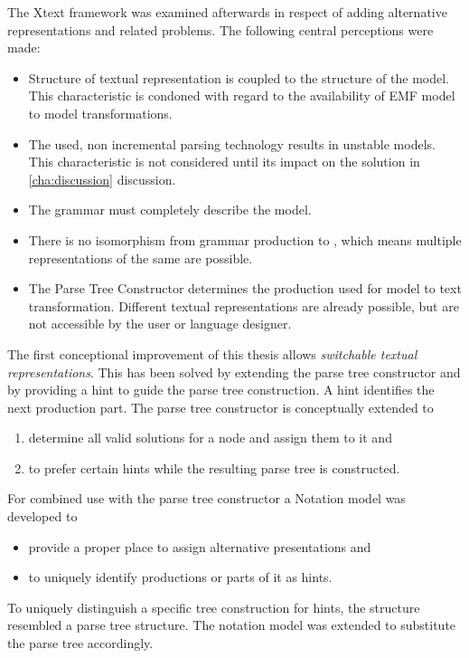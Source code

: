 The Xtext framework was examined afterwards in respect of adding alternative representations and related problems. The following central perceptions were made:
\begin{itemize}
	\item Structure of textual representation is coupled to the structure of the model. This characteristic is condoned with regard to the availability of EMF model to model transformations.
	\item The used, non incremental parsing technology results in unstable models. This characteristic is not considered until its impact on the solution in \ref{cha:discussion} discussion.
	\item The grammar must completely describe the model. 
	\item There is no isomorphism from grammar production to , which means multiple representations of the same  are possible.
	\item The Parse Tree Constructor determines the production used for model to text transformation. Different textual representations are already possible, but are not accessible by the user or language designer. \\
\end{itemize}
 
 
The first conceptional improvement of this thesis allows \emph{switchable textual representations}. This has been solved by extending the parse tree constructor and by providing a hint to guide the parse tree construction. A hint identifies the next production part.
The parse tree constructor is conceptually extended to
\begin{enumerate}
	\item determine all valid solutions for a node and assign them to it and
	\item to prefer certain hints while the resulting parse tree is constructed.
\end{enumerate}
For combined use with the parse tree constructor a Notation model was developed to
\begin{itemize}
	\item provide a proper place to assign alternative presentations and
	\item to uniquely identify productions or parts of it as hints.
\end{itemize}
To uniquely distinguish a specific tree construction for hints, the structure resembled a parse tree structure. The notation model was extended to substitute the parse tree accordingly.\\


